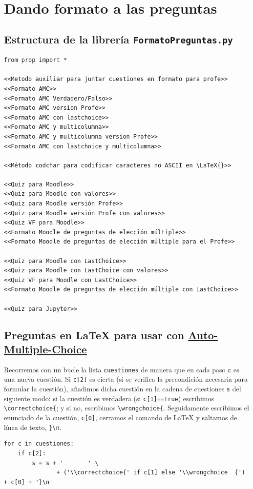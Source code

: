 \documentclass[10pt,a4paper]{report}
\begin{document}
\part{Dando formato a las preguntas}
\label{sec:orgdda8600}

\chapter{Estructura de la librería \texttt{FormatoPreguntas.py}}
\label{sec:orgdc17b3e}

\begin{verbatim}
from prop import *

<<Metodo auxiliar para juntar cuestiones en formato para profe>>
<<Formato AMC>>
<<Formato AMC Verdadero/Falso>>
<<Formato AMC version Profe>>
<<Formato AMC con lastchoice>>
<<Formato AMC y multicolumna>>
<<Formato AMC y multicolumna version Profe>>
<<Formato AMC con lastchoice y multicolumna>>

<<Método codchar para codificar caracteres no ASCII en \LaTeX{}>>
    
<<Quiz para Moodle>>
<<Quiz para Moodle con valores>>
<<Quiz para Moodle versión Profe>>
<<Quiz para Moodle versión Profe con valores>>
<<Quiz VF para Moodle>>
<<Formato Moodle de preguntas de elección múltiple>>
<<Formato Moodle de preguntas de elección múltiple para el Profe>>

<<Quiz para Moodle con LastChoice>>
<<Quiz para Moodle con LastChoice con valores>>
<<Quiz VF para Moodle con LastChoice>>
<<Formato Moodle de preguntas de elección múltiple con LastChoice>>

<<Quiz para Jupyter>>

\end{verbatim}
\chapter{Preguntas en \LaTeX{} para usar con \href{https://www.auto-multiple-choice.net/}{Auto-Multiple-Choice}}
\label{sec:orgecc6a54}


Recorremos con un bucle la lista \texttt{cuestiones} de manera que en cada paso \texttt{c} es una nueva cuestión.  
Si \texttt{c[2]} es cierta (si se verifica la precondición necesaria para formular la cuestión),
añadimos dicha cuestión en la cadena de cuestiones \texttt{s} del siguiente modo: 
si la cuestión es verdadera (si \texttt{c[1]==True}) escribimos \texttt{\textbackslash{}correctchoice\{}; y si no, escribimos \texttt{\textbackslash{}wrongchoice\{}. 
Seguidamente escribimos el enunciado de la cuestión, \texttt{c[0]}, cerramos el comando de \LaTeX{} y saltamos de línea de texto, \texttt{\}\textbackslash{}n}.
\begin{verbatim}
for c in cuestiones:
    if c[2]: 
        s = s + '       ' \
               + ('\\correctchoice{' if c[1] else '\\wrongchoice  {') + c[0] + '}\n'
\end{verbatim}
\end{document}
